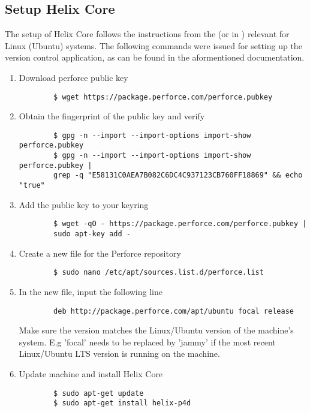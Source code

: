 \subsection{Setup Helix Core}
The setup of Helix Core follows the instructions from the 
\href{https://help.perforce.com/helix-core/quickstart/Content/quickstart/admin-install-linux.html}{\color{blue}{Helix Core Server Administrator Guide}}
(or in \cite{helix} ) relevant for Linux (Ubuntu) systems. The following commands were issued for setting up the version control application, as 
can be found in the aformentioned documentation.
\begin{enumerate}
    \item Download perforce public key
    \begin{verbatim}
        $ wget https://package.perforce.com/perforce.pubkey
    \end{verbatim}
    \item Obtain the fingerprint of the public key and verify
    \begin{verbatim}
        $ gpg -n --import --import-options import-show perforce.pubkey
        $ gpg -n --import --import-options import-show perforce.pubkey | 
        grep -q "E58131C0AEA7B082C6DC4C937123CB760FF18869" && echo "true"
    \end{verbatim}
    \item Add the public key to your keyring
    \begin{verbatim}
        $ wget -qO - https://package.perforce.com/perforce.pubkey | 
        sudo apt-key add -
    \end{verbatim}
    \item Create a new file for the Perforce repository
    \begin{verbatim}
        $ sudo nano /etc/apt/sources.list.d/perforce.list
    \end{verbatim}
    \item In the new file, input the following line
    \begin{verbatim}
        deb http://package.perforce.com/apt/ubuntu focal release
    \end{verbatim}
    Make sure the version matches the Linux/Ubuntu version of the machine's system. E.g 'focal' needs to be replaced by
    'jammy' if the most recent Linux/Ubuntu LTS version is running on the machine.
    \item Update machine and install Helix Core
    \begin{verbatim}
        $ sudo apt-get update
        $ sudo apt-get install helix-p4d

\end{verbatim}
\end{enumerate}
